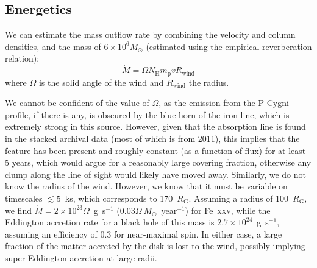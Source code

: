 \documentclass[10pt, a4paper]{article}
\begin{document}


\subsection*{Energetics}

We can estimate the mass outflow rate by combining the velocity and column densities\cite{Nardini15}, and the mass of $6\times10^{6}M_\odot$\cite{Zhou05} (estimated using the empirical reverberation relation\cite{Kaspi00}):
\begin{equation}
\dot{M}=\Omega N_\mathrm{H} m_\mathrm{p} v R_\mathrm{wind}
\end{equation}
where $\Omega$ is the solid angle of the wind and $R_\mathrm{wind}$ the radius.

We cannot be confident of the value of $\Omega$, as the emission from the P-Cygni profile, if there is any, is obscured by the blue horn of the iron line, which is extremely strong in this source. However, given that the absorption line is found in the stacked archival data (most of which is from 2011), this implies that the feature has been present and roughly constant (as a function of flux) for at least 5 years, which would argue for a reasonably large covering fraction, otherwise any clump along the line of sight would likely have moved away. 
Similarly, we do not know the radius of the wind. However, we know that it must be variable on timescales $\lesssim5$~ks, which corresponds to 170~$R_\mathrm{G}$. 
Assuming a radius of 100~$R_\mathrm{G}$, we find $\dot{M}=2\times 10^{23}\Omega$~g~s$^{-1}$ ($0.03\Omega\ M_\odot$~year$^{-1}$) for Fe~\textsc{xxv}, while the Eddington accretion rate for a black hole of this mass is $2.7\times 10^{24}$~g~s$^{-1}$, assuming an efficiency of 0.3 for near-maximal spin. In either case, a large fraction of the matter accreted by the disk is lost to the wind, possibly implying super-Eddington accretion at large radii.
\end{document}
